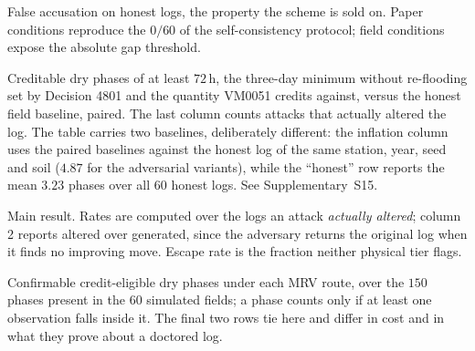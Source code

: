 



\begin{table}[!t]
\centering
\caption{False accusation on honest logs, the property the
scheme is sold on. Paper conditions reproduce the $0/60$ of the self-consistency
protocol; field conditions expose the absolute gap threshold.}
\label{tab:falseacc}
\footnotesize

\end{table}

\begin{table}[!t]
\centering
\caption{Creditable dry phases of at least $72$\,h, the three-day minimum without
re-flooding set by Decision 4801 and the quantity VM0051 credits against, versus
the honest field baseline, paired. The
last column counts attacks that actually altered the log. The table carries two
baselines, deliberately different: the inflation column uses the paired baselines
against the honest log of the same station, year, seed and soil ($4.87$ for the
adversarial variants), while the ``honest'' row reports the mean $3.23$ phases
over all $60$ honest logs. See Supplementary~S15.}
\label{tab:credit}
\footnotesize

\end{table}

\begin{table}[!t]
\centering
\caption{Main result. Rates are computed over the logs an attack
\emph{actually altered}; column 2 reports altered over generated, since the
adversary returns the original log when it finds no improving move. Escape rate
is the fraction neither physical tier flags.}
\label{tab:defence}
\footnotesize

\end{table}



\begin{table}[!t]
\centering
\caption{Confirmable credit-eligible dry phases under each MRV route, over the $150$ phases present in the $60$ simulated fields; a phase counts only if at least one observation falls inside it. The final two rows tie here and differ in cost and in what they prove about a doctored log.}
\label{tab:benchmark}
\footnotesize

\end{table}


